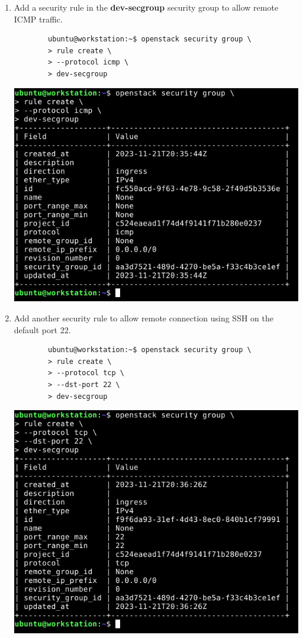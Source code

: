 \documentclass[letterpaper, 12pt]{article}
\begin{document}
\begin{enumerate}
    \item Add a security rule in the \textbf{dev-secgroup} security group to allow remote ICMP traffic.
    \begin{lstlisting}
        ubuntu@workstation:~$ openstack security group \
        > rule create \
        > --protocol icmp \
        > dev-secgroup
    \end{lstlisting}

    \begin{center}
        \includegraphics[width=\linewidth]{images/part4/step18.png}
    \end{center}

    \item Add another security rule to allow remote connection using SSH on the default port 22.
    \begin{lstlisting}
        ubuntu@workstation:~$ openstack security group \
        > rule create \
        > --protocol tcp \
        > --dst-port 22 \
        > dev-secgroup
    \end{lstlisting}

    \begin{center}
        \includegraphics[width=\linewidth]{images/part4/step19.png}
    \end{center}


\end{enumerate}
\end{document}

